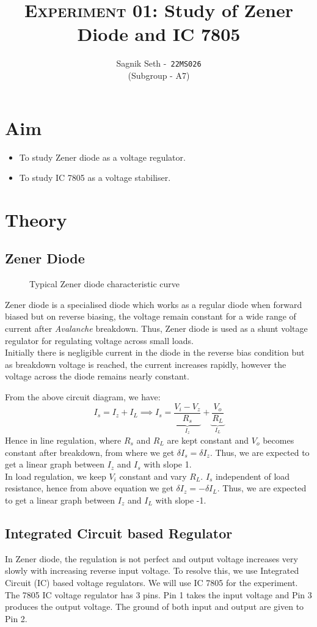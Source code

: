 \documentclass{scrartcl}
\title{
        \Large\textsc{Experiment 01: }
        \huge\textbf{Study of Zener Diode and IC 7805} \\
}
\author{{\Large Sagnik Seth} -\   \texttt{22MS026}\\ ({\small Subgroup - A7}) }
\date{}
\begin{document}
\maketitle
\section{Aim}
\begin{itemize}
        \item To study Zener diode as a voltage regulator.
        \item To study IC 7805 as a voltage stabiliser.
\end{itemize}

\section{Theory}
\subsection{Zener Diode}
\begin{figure}[H]
        \centering
        
        \caption{Typical Zener diode characteristic curve}
\end{figure}
Zener diode is a specialised diode which works as a regular diode when forward biased but on reverse biasing, the voltage remain constant for a wide range of current after \textit{Avalanche} breakdown. Thus, Zener diode is used as a shunt voltage regulator for regulating voltage across small loads.\\[0.3cm]
Initially there is negligible current in the diode in the reverse bias condition but as breakdown voltage is reached, the current increases rapidly, however the voltage across the diode remains nearly constant.

\noindent
From the above circuit diagram, we have:
 $$I_s = I_z+I_L \implies I_s = \underbrace{\frac{V_i - V_z}{R_s}}_{I_z} + \underbrace{\frac{V_o}{R_L}}_{I_L}$$
Hence in line regulation, where $R_s$ and $R_L$ are kept constant and $V_o$ becomes constant after breakdown, from where we get $\delta I_s = \delta I_z$. Thus, we are expected to get a linear graph between $I_z$ and $I_s$ with slope 1.\\[0.3cm]
In load regulation, we keep $V_i$ constant and vary $R_L$. $I_s$ independent of load resistance, hence from above equation we get $\delta I_z = -\delta I_L$. Thus, we are expected to get a linear graph between $I_z$ and $I_L$ with slope -1.
\noindent
\subsection{Integrated Circuit based Regulator}
In Zener diode, the regulation is not perfect and output
voltage increases very slowly with increasing reverse input voltage. To resolve this, we use Integrated Circuit (IC) based voltage regulators. We will use IC 7805 for the experiment.
The 7805 IC voltage regulator has
3 pins. Pin 1 takes the input voltage and Pin 3 produces the output
voltage. The ground of both input and output are given to Pin 2.

\end{document}
